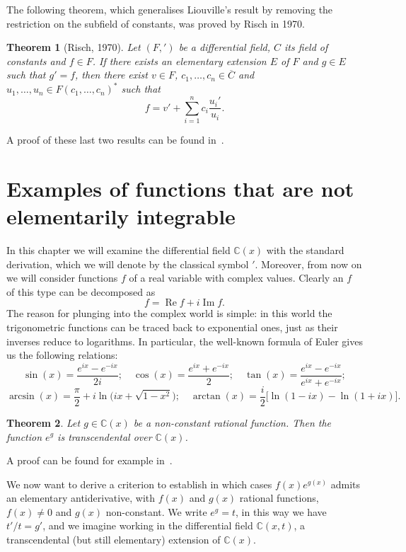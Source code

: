 \documentclass[11pt]{article}
\theoremstyle{plain}
\newtheorem{theorem}{Theorem}
\theoremstyle{definition}
\theoremstyle{remark}
\newcommand{\C}{\mathbb{C}}
\DeclareMathOperator{\Real}{Re}
\DeclareMathOperator{\Imag}{Im}
\begin{document}
The following theorem, which generalises Liouville's result by removing
the restriction on the subfield of constants, was proved by Risch in
1970.

\begin{theorem}[Risch, 1970]\label{thm:risch}
Let $(F, ')$ be a differential field, $C$ its field of constants and
$f \in F$. If there exists an elementary extension $E$ of $F$ and
$g \in E$ such that $g' = f$, then there exist $v \in F$,
$c_{1}, \ldots, c_{n} \in \overline{C}$ and
$u_{1}, \ldots, u_{n} \in F(c_{1}, \ldots, c_{n})^{*}$ such that
\[
f = v' + \sum_{i=1}^{n} c_{i} \frac{u_{i}'}{u_{i}}.
\]
\end{theorem}

A proof of these last two results can be found in~\cite{Bronstein}.

\section{Examples of functions that are not elementarily integrable}
In this chapter we will examine the differential field $\C(x)$ with the
standard derivation, which we will denote by the classical symbol $'$.
Moreover, from now on we will consider functions $f$ of a real variable
with complex values. Clearly an $f$ of this type can be decomposed as
\[
f = \Real f + i \Imag f.
\]
The reason for plunging into the complex world is simple: in this world
the trigonometric functions can be traced back to exponential ones,
just as their inverses reduce to logarithms. In particular, the
well-known formula of Euler gives us the following relations:
\[
\sin(x) = \frac{e^{ix} - e^{-ix}}{2i}; \quad
\cos(x) = \frac{e^{ix} + e^{-ix}}{2}; \quad
\tan(x) = \frac{e^{ix} - e^{-ix}}{e^{ix} + e^{-ix}};
\]
\[
\arcsin(x) = \frac{\pi}{2} + i \ln\bigl(ix + \sqrt{1 - x^{2}}\bigr);
\quad
\arctan(x) = \frac{i}{2}\bigl[\ln(1 - ix) - \ln(1 + ix)\bigr].
\]

\begin{theorem}\label{thm:exptranscend}
Let $g \in \C(x)$ be a non-constant rational function. Then the
function $e^{g}$ is transcendental over $\C(x)$.
\end{theorem}

A proof can be found for example in~\cite{DeLellis}.

We now want to derive a criterion to establish in which cases
$f(x) e^{g(x)}$ admits an elementary antiderivative, with $f(x)$ and
$g(x)$ rational functions, $f(x) \neq 0$ and $g(x)$ non-constant. We
write $e^{g} = t$, in this way we have $t'/t = g'$, and we imagine
working in the differential field $\C(x, t)$, a transcendental (but
still elementary) extension of $\C(x)$.
\end{document}
